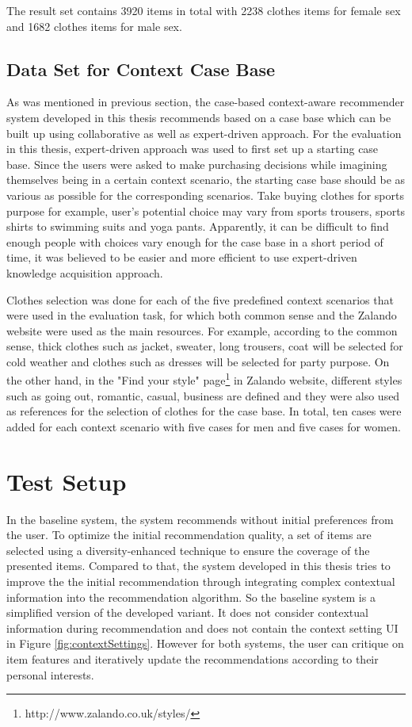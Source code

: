 The result set contains 3920 items in total with 2238 clothes items for female sex and 1682 clothes items for male sex.

\subsection{Data Set for Context Case Base} \label{sec:ds_ccb}

As was mentioned in previous section, the case-based context-aware recommender system developed in this thesis recommends based on a case base which can be built up using collaborative as well as expert-driven approach. For the evaluation in this thesis, expert-driven approach was used to first set up a starting case base. Since the users were asked to make purchasing decisions while imagining themselves being in a certain context scenario, the starting case base should be as various as possible for the corresponding scenarios. Take buying clothes for sports purpose for example, user's potential choice may vary from sports trousers, sports shirts to swimming suits and yoga pants. Apparently, it can be difficult to find enough people with choices vary enough for the case base in a short period of time, it was believed to be easier and more efficient to use expert-driven knowledge acquisition approach.

Clothes selection was done for each of the five predefined context scenarios that were used in the evaluation task, for which both common sense and the Zalando website were used as the main resources. For example, according to the common sense, thick clothes such as jacket, sweater, long trousers, coat will be selected for cold weather and clothes such as dresses will be selected for party purpose. On the other hand,  in the "Find your style" page\footnote{http://www.zalando.co.uk/styles/} in Zalando website, different styles such as going out, romantic, casual, business are defined and they were also used as references for the selection of clothes for the case base. In total, ten cases were added for each context scenario with five cases for men and five cases for women. 

\section{Test Setup} \label{sec:ts}

In the baseline system, the system recommends without initial preferences from the user. To optimize the initial recommendation quality,  a set of items are selected using a diversity-enhanced technique to ensure the coverage of the presented items. Compared to that, the system developed in this thesis tries to improve the the initial recommendation through integrating complex contextual information into the recommendation algorithm. So the baseline system is a simplified version of the developed variant. It does not consider contextual information during recommendation and does not contain the context setting UI in Figure \ref{fig:contextSettings}. However for both systems, the user can critique on item features and iteratively update the recommendations according to their personal interests. 

